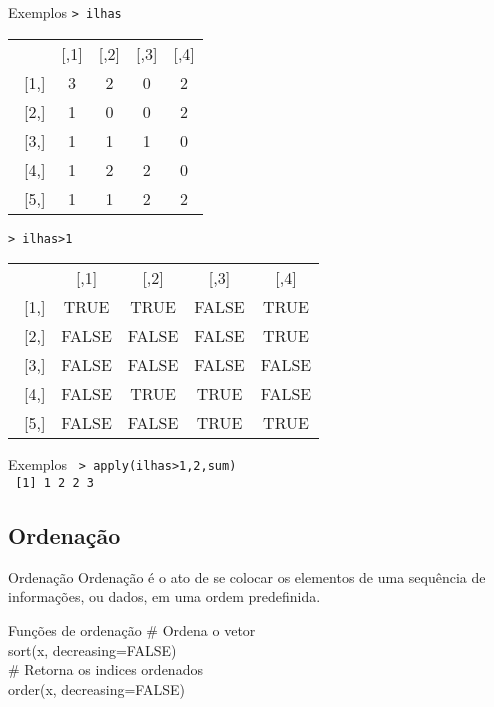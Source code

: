 \documentclass{beamer}
\begin{document}
 \begin{frame}{Exemplos}
 \texttt{> ilhas}\\
 \begin{table}[!h]
\begin{tabular}{ccccc} 
   &[,1]&[,2]&[,3]&[,4]\\
~[1,]  &  3  &  2 &   0  &  2\\
~[2,]  &  1  &  0 &   0  &  2\\
~[3,]  &  1  &  1 &   1  &  0\\
~[4,]  &  1  &  2 &   2  &  0\\
~[5,]  &  1  &  1 &   2  &  2\\
 \end{tabular} 
\end{table}

\texttt{> ilhas>1 \\}
 \begin{table}[!h]
\begin{tabular}{ccccc}
     & [,1]&  [,2]&  [,3] & [,4]\\
~[1,]&  TRUE & TRUE & FALSE & TRUE\\
~[2,]& FALSE &FALSE & FALSE & TRUE\\
~[3,]& FALSE &FALSE & FALSE & FALSE\\
~[4,]& FALSE & TRUE & TRUE & FALSE\\
~[5,]& FALSE &FALSE & TRUE & TRUE\\
 \end{tabular} 
\end{table}
 \end{frame}

 \begin{frame}{Exemplos}
\texttt{ > apply(ilhas>1,2,sum)\\
~[1] 1 2 2 3}
 \end{frame}

\subsection{Ordenação}
\begin{frame}{Ordenação}
Ordenação é o ato de se colocar os elementos de uma sequência de informações, ou dados, em uma ordem predefinida.

\begin{block}{Funções de ordenação}
\# Ordena o vetor\\
sort(x, decreasing=FALSE) \\ \vspace{10pt}
\# Retorna os indices ordenados \\
order(x, decreasing=FALSE) \\ \vspace{10pt}
\end{block}
  
\end{frame}
\end{document}
